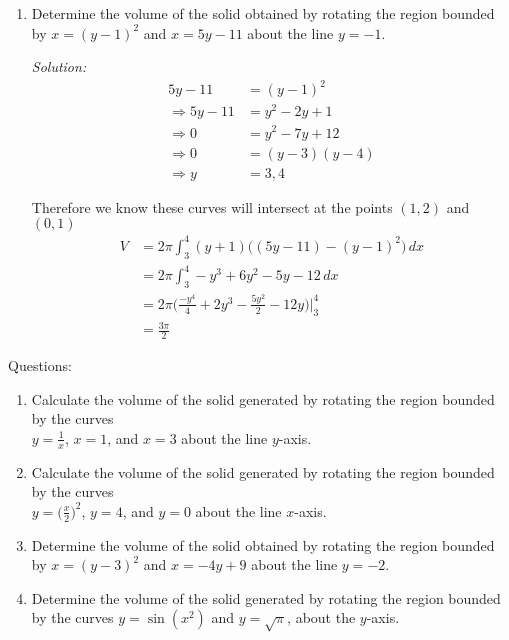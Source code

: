 \documentclass[16pt]{article}
\theoremstyle{remark}
\begin{document}
\begin{enumerate}
\item Determine the volume of the solid obtained by rotating the region bounded by 
$x=(y-1)^2$ and $x=5y-11$ about the line $y=-1$.
\begin{mdframed}[style=TheoremFrame]
\textit{Solution:}
\begin{align*}
5y-11 &= (y-1)^2\\
\Rightarrow 5y-11 &= y^2 - 2y + 1\\
\Rightarrow 0 &=  y^2 - 7y + 12\\
\Rightarrow 0 &= (y-3)(y-4)\\
\Rightarrow y&= 3,4
\end{align*}

Therefore we know these curves will intersect at the points $(1,2)$ and $(0,1)$
\begin{align*}
V &= 2\pi \int_3^4 (y+1) \big((5y-11)-(y-1)^2\big) \, dx\\
&=  2\pi \int_3^4 -y^3 + 6y^2 - 5y -12 \, dx\\
&= 2\pi \bigg( \frac{-y^4}{4} + 2y^3 - \frac{5y^2}{2} - 12y \bigg) \bigg|_3^4\\
&= \frac{3\pi}{2}
\end{align*}
\end{mdframed}
\end{enumerate}
\newpage
Questions:
\begin{enumerate}
\item Calculate the volume of the solid generated by rotating the region bounded by the curves\\ $\displaystyle{y=\frac{1}{x}}$, $x=1$, and $x=3$ about the line $y$-axis.
\vspace{8.5cm}
\item Calculate the volume of the solid generated by rotating the region bounded by the curves\\ $\displaystyle{y=\bigg(\frac{x}{2}\bigg)^2}$, $y=4$, and $y=0$ about the line $x$-axis.

\newpage
\item Determine the volume of the solid obtained by rotating the region bounded by 
$x=(y-3)^2$ and $x=-4y+9$ about the line $y=-2$.
\vspace{8.5cm}
\item Determine the volume of the solid generated by rotating the region bounded by the curves $y=\sin(x^2)$ and $y=\sqrt{\pi}$, about the $y$-axis.
\end{enumerate}
\end{document}
